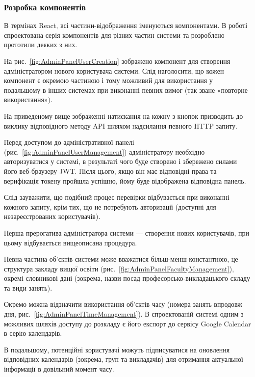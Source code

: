 \subsubsection{Розробка компонентів}

В термінах React, всі частини-відображення іменуються компонентами. В роботі спроектована серія компонентів для різних частин системи та розроблено прототипи деяких з них. 

На рис.~\ref{fig:AdminPanelUserCreation} зображено компонент для створення адміністратором нового користувача системи. Слід наголосити, що кожен компонент є окремою частиною і тому можливий для використання у подальшому в інших системах при виконанні певних вимог (так зване «повторне використання»).


На приведеному вище зображенні натискання на кожну з кнопок призводить до виклику відповідного методу API шляхом надсилання певного HTTP запиту.

Перед доступом до адміністративної панелі (рис.~\ref{fig:AdminPanelUserManagement}) адміністратору необхідно авторизуватися у системі, в результаті чого буде створено і збережено силами його веб-браузеру JWT. Після цього, якщо він має відповідні права  та верифікація токену пройшла успішно, йому буде відображена відповідна панель.


Слід зауважити, що подібний процес перевірки відбувається при виконанні кожного запиту, крім тих, що не потребують авторизації (доступні для незареєстрованих користувачів).

Перша прерогатива адміністратора системи — створення нових користувачів, при цьому відбувається вищеописана процедура.

Певна частина об’єктів системи може вважатися більш-менш константною, це структура закладу вищої освіти (рис.~\ref{fig:AdminPanelFacultyManagement}), окремі словникові дані (зокрема, назви посад професорсько-викладацького складу та види занять).


Окремо можна відзначити використання об’єктів часу (номера занять впродовж дня, рис.~\ref{fig:AdminPanelTimeManagement}).  В спроектованій системі одним з можливих шляхів доступу до розкладу є його експорт до сервісу Google Calendar в серію календарів. 


В подальшому, потенційні користувачі можуть підписуватися на оновлення відповідних календарів (зокрема, груп та викладачів) для отримання актуальної інформації в довільний момент часу.
